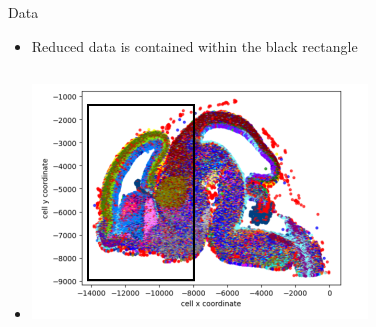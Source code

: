 \documentclass{beamer}
\begin{document}
\begin{frame}{Data}

\begin{itemize}
    \item<1-> Reduced data is contained within the black rectangle
    \item<2-> []
    \begin{columns}
        \begin{column}{0.9\textwidth} %
          \includegraphics[width=0.7\textwidth]{reducedData.png}
          \caption{Visual representation of reduced data}
        \end{column}
    \end{columns}
        
\end{itemize}

\end{frame}
\end{document}
